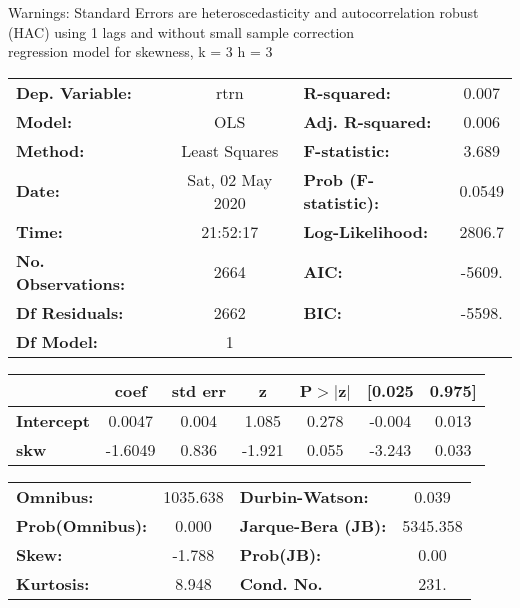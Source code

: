 Warnings: \newline
 [1] Standard Errors are heteroscedasticity and autocorrelation robust (HAC) using 1 lags and without small sample correction\\ 

regression model for skewness, k = 3 h = 3\begin{center}
\begin{tabular}{lclc}
\toprule
\textbf{Dep. Variable:}    &       rtrn       & \textbf{  R-squared:         } &     0.007   \\
\textbf{Model:}            &       OLS        & \textbf{  Adj. R-squared:    } &     0.006   \\
\textbf{Method:}           &  Least Squares   & \textbf{  F-statistic:       } &     3.689   \\
\textbf{Date:}             & Sat, 02 May 2020 & \textbf{  Prob (F-statistic):} &   0.0549    \\
\textbf{Time:}             &     21:52:17     & \textbf{  Log-Likelihood:    } &    2806.7   \\
\textbf{No. Observations:} &        2664      & \textbf{  AIC:               } &    -5609.   \\
\textbf{Df Residuals:}     &        2662      & \textbf{  BIC:               } &    -5598.   \\
\textbf{Df Model:}         &           1      & \textbf{                     } &             \\
\bottomrule
\end{tabular}
\begin{tabular}{lcccccc}
                   & \textbf{coef} & \textbf{std err} & \textbf{z} & \textbf{P$> |$z$|$} & \textbf{[0.025} & \textbf{0.975]}  \\
\midrule
\textbf{Intercept} &       0.0047  &        0.004     &     1.085  &         0.278        &       -0.004    &        0.013     \\
\textbf{skw}       &      -1.6049  &        0.836     &    -1.921  &         0.055        &       -3.243    &        0.033     \\
\bottomrule
\end{tabular}
\begin{tabular}{lclc}
\textbf{Omnibus:}       & 1035.638 & \textbf{  Durbin-Watson:     } &    0.039  \\
\textbf{Prob(Omnibus):} &   0.000  & \textbf{  Jarque-Bera (JB):  } & 5345.358  \\
\textbf{Skew:}          &  -1.788  & \textbf{  Prob(JB):          } &     0.00  \\
\textbf{Kurtosis:}      &   8.948  & \textbf{  Cond. No.          } &     231.  \\
\bottomrule
\end{tabular}
\end{center}

